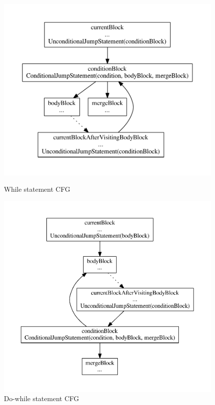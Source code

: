 \begin{figure}[htb]
    \centering
    \begin{minipage}[b]{0.45\textwidth}
        \centering
        \includegraphics[width=\textwidth]{src/graph/while.pdf}
        \caption{While statement CFG\label{img:while-statement}}
    \end{minipage}
    \hfill
    \begin{minipage}[b]{0.45\textwidth}
        \centering
        \includegraphics[width=\textwidth]{src/graph/do-while.pdf}
        \caption{Do-while statement CFG\label{img:do-while-statement}}
    \end{minipage}
\end{figure}

